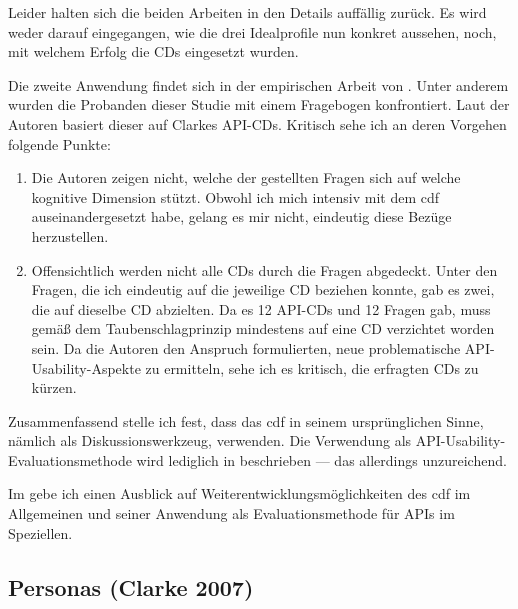 \begin{important}
Leider halten sich die beiden Arbeiten in den Details auffällig zurück. Es wird weder darauf eingegangen, wie die drei Idealprofile nun konkret aussehen, noch, mit welchem Erfolg die CDs eingesetzt wurden.

Die zweite Anwendung findet sich in der empirischen Arbeit von \cite{Piccioni:2013uq}. Unter anderem wurden die Probanden dieser Studie mit einem Fragebogen konfrontiert. Laut der Autoren basiert dieser auf Clarkes API-CDs. Kritisch sehe ich an deren Vorgehen folgende Punkte:
\begin{enumerate}
  \item Die Autoren zeigen nicht, welche der gestellten Fragen sich auf welche kognitive Dimension stützt. Obwohl ich mich intensiv mit dem \gls{cdf} auseinandergesetzt habe, gelang es mir nicht, eindeutig diese Bezüge herzustellen.
  \item Offensichtlich werden nicht alle CDs durch die Fragen abgedeckt. Unter den Fragen, die ich eindeutig auf die jeweilige CD beziehen konnte, gab es zwei, die auf dieselbe CD abzielten. Da es 12 API-CDs und 12 Fragen gab, muss gemäß dem Taubenschlagprinzip mindestens auf eine CD verzichtet worden sein. Da die Autoren den Anspruch formulierten, neue problematische API-Usability-Aspekte zu ermitteln, sehe ich es kritisch, die erfragten CDs zu kürzen. 
\end{enumerate}

Zusammenfassend stelle ich fest, dass \cite{Piccioni:2013uq} das \gls{cdf} in seinem ursprünglichen Sinne, nämlich als Diskussionswerkzeug, verwenden. Die Verwendung als API-Usability-Evaluationsmethode wird lediglich in \cite{Clarke:2003wk,clarke:2006} beschrieben --- das allerdings unzureichend.

Im  gebe ich einen Ausblick auf Weiterentwicklungsmöglichkeiten des \gls{cdf} im Allgemeinen und seiner Anwendung als Evaluationsmethode für APIs im Speziellen.
\end{important}



\subsection{Personas (Clarke 2007)}
\label{sec:personas}

